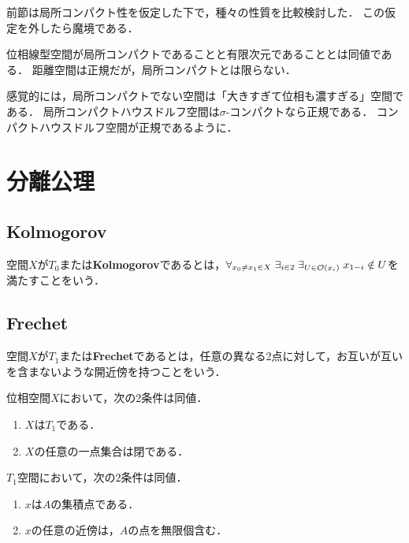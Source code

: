 \documentclass[uplatex,dvipdfmx]{jsreport}
\begin{document}
\begin{tcolorbox}[colframe=ForestGreen, colback=ForestGreen!10!white,breakable,colbacktitle=ForestGreen!40!white,coltitle=black,fonttitle=\bfseries\sffamily,
title=]
    前節は局所コンパクト性を仮定した下で，種々の性質を比較検討した．
    この仮定を外したら魔境である．
\end{tcolorbox}

位相線型空間が局所コンパクトであることと有限次元であることとは同値である．
距離空間は正規だが，局所コンパクトとは限らない．

感覚的には，局所コンパクトでない空間は「大きすぎて位相も濃すぎる」空間である．
局所コンパクトハウスドルフ空間は$\sigma$-コンパクトなら正規である．
コンパクトハウスドルフ空間が正規であるように．

\section{分離公理}

\subsection{Kolmogorov}

\begin{definition}
    空間$X$が$T_0$または\textbf{Kolmogorov}であるとは，$\forall_{x_0\ne x_1\in X}\;\exists_{i\in2}\;\exists_{U\in\mathcal{O}(x_i)}\;x_{1-i}\notin U$を満たすことをいう．
\end{definition}

\subsection{Frechet}

\begin{definition}
    空間$X$が$T_1$または\textbf{Frechet}であるとは，任意の異なる2点に対して，お互いが互いを含まないような開近傍を持つことをいう．
\end{definition}

\begin{proposition}[$T_1$-性の特徴付け]
    位相空間$X$において，次の2条件は同値．
    \begin{enumerate}
        \item $X$は$T_1$である．
        \item $X$の任意の一点集合は閉である．
    \end{enumerate}
\end{proposition}

\begin{proposition}\label{prop-property-of-T1-spaces}
    $T_1$空間において，次の2条件は同値．
    \begin{enumerate}
        \item $x$は$A$の集積点である．
        \item $x$の任意の近傍は，$A$の点を無限個含む．
    \end{enumerate}
\end{proposition}
\end{document}
